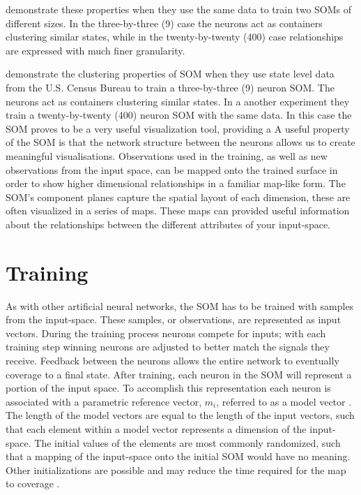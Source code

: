 \cite{skupin08} demonstrate these properties when they use the same data to train two SOMs
of different sizes.  In the three-by-three (9) case the neurons act as
containers clustering similar states, while in the twenty-by-twenty (400) case
relationships are expressed with much finer granularity.

\cite{skupin08} demonstrate the clustering properties
of SOM when they use state level data from the U.S. Census Bureau to train a
three-by-three (9) neuron SOM.  The neurons act as containers clustering
similar states.  In a another experiment they train a twenty-by-twenty (400)
neuron SOM with the same data.  In this case the SOM proves to be a very
useful visualization tool, providing a 
A useful property of the SOM is that the network structure between the neurons
allows us to create meaningful visualisations.  Observations used in the
training, as well as new observations from the input space,  can be mapped
onto the trained surface in order to show higher dimensional relationships in a
familiar map-like form. The SOM's component planes capture the spatial layout
of each dimension, these are often visualized in a series of maps.  These
maps can provided useful information about the relationships between the
different attributes of your input-space.

\section{Training}
As with other artificial neural networks, the SOM has to be trained with
samples from the input-space.  These samples, or observations, are represented
as input vectors.  During the training process neurons compete for inputs;
with each training step winning neurons are adjusted to better match the
signals they receive.  Feedback between the neurons allows the entire network to
eventually coverage to a final state. After training, each neuron in the SOM
will represent a portion of the input space.  To accomplish this
representation each neuron is associated with a parametric reference vector,
\(m_i\), referred to as a model vector \citep{Kohonen2000}.  The length of the
model vectors are equal to the length of the input vectors, such that each
element within a model vector represents a dimension of the input-space.  The
initial values of the elements are most commonly randomized, such that a
mapping of the input-space onto the initial SOM would have no meaning. Other
initializations are possible and may reduce the time required for the map to
coverage \citep{Kohonen2000}.

